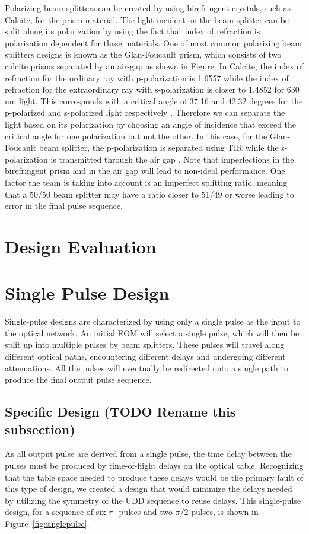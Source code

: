 \documentclass[pdftex,12pt,a4paper]{article}
\begin{document}
Polarizing beam splitters can be created by using birefringent crystals, such as Calcite, for the prism material. The light incident on the beam splitter can be split along its polarization by using the fact that index of refraction is polarization dependent for these materials. One of most common polarizing beam splitters designs is known as the Glan-Foucault prism, which consists of two calcite prisms separated by an air-gap as shown in Figure. In Calcite, the index of refraction for the ordinary ray with p-polarization is 1.6557 while the index of refraction for the extraordinary ray with s-polarization is closer to 1.4852 for 630 nm light. This corresponds with a critical angle of 37.16 and 42.32 degrees for the p-polarized and s-polarized light respectively \cite{Properties_of_Prisms}. Therefore we can separate the light based on its polarization by choosing an angle of incidence that exceed the critical angle for one polarization but not the other. In this case, for the Glan-Foucault beam splitter, the p-polarization is separated using TIR while the s-polarization is transmitted through the air gap \cite{Properties_of_Prisms}. Note that imperfections in the birefringent prism and in the air gap will lead to non-ideal performance. One factor the team is taking into account is an imperfect splitting ratio, meaning that a 50/50 beam splitter may have a ratio closer to 51/49 or worse leading to error in the final pulse sequence.


\section{Design Evaluation}
\label{sec:design_evaluation}

\section{Single Pulse Design}
\label{sec:single_pulse_design}
Single-pulse designs are characterized by using only a single pulse as the input to the optical network. An initial EOM will select a single pulse, which will then be split up into multiple pulses by beam splitters. These pulses will travel along different optical paths, encountering different delays and undergoing different attenuations. All the pulses will eventually be redirected onto a single path to produce the final output pulse sequence. 

\subsection{Specific Design (TODO Rename this subsection)}
As all output pulse are derived from a single pulse, the time delay between the pulses must be produced by time-of-flight delays on the optical table. Recognizing that the table space needed to produce these delays would be the primary fault of this type of design, we created a design that would minimize the delays needed by utilizing the symmetry of the UDD sequence to reuse delays. This single-pulse design, for a sequence of six $\pi$- pulses and two $\pi/2$-pulses, is shown in Figure~\ref{fig:singlepulse}. 
\end{document}
